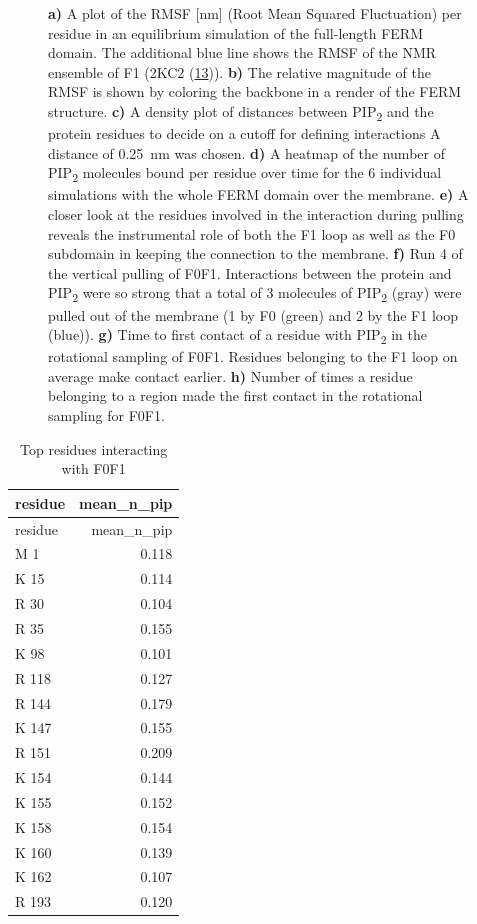 \documentclass[
  twocolumn]{biophys-new-mod}
\begin{document}
\begin{figure}
\begin{minipage}[t]{0.50\linewidth}
{{}

}

\subcaption{\label{fig-f0f1-first-to-find}~}
\end{minipage}%

\caption{\label{fig-suppl}\textbf{a)} A plot of the RMSF {[}nm{]} (Root
Mean Squared Fluctuation) per residue in an equilibrium simulation of
the full-length FERM domain. The additional blue line shows the RMSF of
the NMR ensemble of F1 (2KC2
(\protect\hyperlink{ref-goultStructureDoubleUbiquitinlike2010}{13})).
\textbf{b)} The relative magnitude of the RMSF is shown by coloring the
backbone in a render of the FERM structure. \textbf{c)} A density plot
of distances between PIP\textsubscript{2} and the protein residues to
decide on a cutoff for defining interactions A distance of 0.25~nm was
chosen. \textbf{d)} A heatmap of the number of PIP\textsubscript{2}
molecules bound per residue over time for the 6 individual simulations
with the whole FERM domain over the membrane. \textbf{e)} A closer look
at the residues involved in the interaction during pulling reveals the
instrumental role of both the F1 loop as well as the F0 subdomain in
keeping the connection to the membrane. \textbf{f)} Run 4 of the
vertical pulling of F0F1. Interactions between the protein and
PIP\textsubscript{2} were so strong that a total of 3 molecules of
PIP\textsubscript{2} (gray) were pulled out of the membrane (1 by F0
(green) and 2 by the F1 loop (blue)). \textbf{g)} Time to first contact
of a residue with PIP\textsubscript{2} in the rotational sampling of
F0F1. Residues belonging to the F1 loop on average make contact earlier.
\textbf{h)} Number of times a residue belonging to a region made the
first contact in the rotational sampling for F0F1.}

\end{figure}

\hypertarget{tbl-f0f1-top-interacting}{}
\begin{longtable}[]{@{}lr@{}}
\caption{\label{tbl-f0f1-top-interacting}Top residues interacting with
F0F1}\tabularnewline
\toprule()
residue & mean\_n\_pip \\
\midrule()
\endfirsthead
\toprule()
residue & mean\_n\_pip \\
\midrule()
\endhead
M 1 & 0.118 \\
K 15 & 0.114 \\
R 30 & 0.104 \\
R 35 & 0.155 \\
K 98 & 0.101 \\
R 118 & 0.127 \\
R 144 & 0.179 \\
K 147 & 0.155 \\
R 151 & 0.209 \\
K 154 & 0.144 \\
K 155 & 0.152 \\
K 158 & 0.154 \\
K 160 & 0.139 \\
K 162 & 0.107 \\
R 193 & 0.120 \\
\bottomrule()
\end{longtable}
\end{document}
